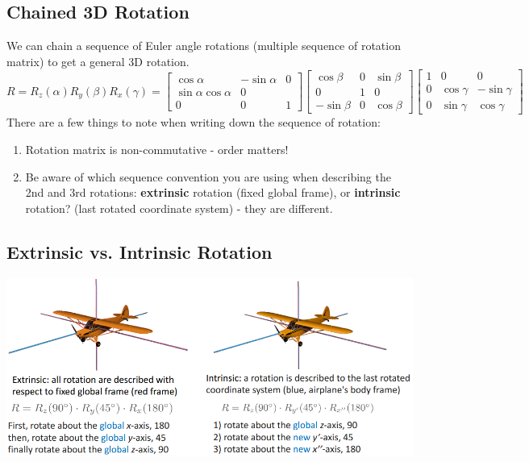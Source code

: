 \documentclass[10pt]{article}
\begin{document}
\subsection*{Chained 3D Rotation}
We can chain a sequence of Euler angle rotations (multiple sequence of rotation matrix) to get a general 3D rotation.
\[R = R_z(\alpha) R_y(\beta) R_x(\gamma) = \begin{bmatrix} \cos \alpha & -\sin \alpha & 0 \\ \sin \alpha \cos \alpha & 0 \\ 0 & 0 & 1 \end{bmatrix} \begin{bmatrix} \cos \beta & 0 & \sin \beta \\ 0 & 1 & 0 \\ -\sin \beta & 0 & \cos \beta \end{bmatrix} \begin{bmatrix} 1 & 0 & 0 \\ 0 & \cos \gamma & -\sin \gamma \\ 0 & \sin \gamma & \cos \gamma \end{bmatrix}\]
There are a few things to note when writing down the sequence of rotation:
\begin{enumerate}
    \item Rotation matrix is non-commutative - order matters!
    \item Be aware of which sequence convention you are using when describing the 2nd and 3rd rotations: \textbf{extrinsic} rotation (fixed global frame), or \textbf{intrinsic} rotation? (last rotated coordinate system) - they are different.
\end{enumerate}

\subsection*{Extrinsic vs. Intrinsic Rotation}
\begin{center} 
	\includegraphics*[width=\textwidth]{L1_14.png} 
\end{center}
\end{document}
